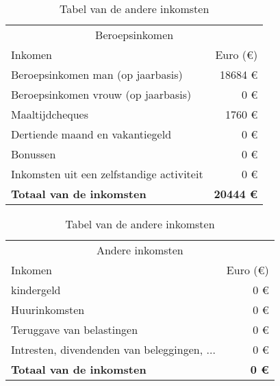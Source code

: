 \begin{table}[ht]
	\begin{minipage}[b]{9cm}\centering
		\begin{tabular}{@{}lr@{}}
			\toprule
			               \multicolumn{2}{c}{Beroepsinkomen}                 \\
			\cmidrule(r){1-2}
		Inkomen               &        Euro (\euro{}) \\ \midrule
			Beroepsinkomen man (op jaarbasis)         &         18684 \euro{} \\
			Beroepsinkomen vrouw (op jaarbasis)       &             0 \euro{} \\
			Maaltijdcheques                           &           1760 \euro{} \\
			Dertiende maand en vakantiegeld           &             0 \euro{} \\
			Bonussen                                  &             0 \euro{} \\
			Inkomsten uit een zelfstandige activiteit &             0 \euro{} \\ \toprule
			\textbf{Totaal van de inkomsten}          & \textbf{20444 \euro{}} \\ \bottomrule
		\end{tabular}
	\caption{Tabel van het beroepsinkomen}
	\label{tab:tabelberoepsinkomen}
		
		
	\end{minipage}
	\hspace{0.5cm}
\begin{minipage}[b]{9cm}\centering
	\begin{tabular}{@{}lr@{}} \toprule
		\multicolumn{2}{c}{Andere inkomsten} \\ \cmidrule(r){1-2}
		Inkomen    										& Euro (\euro{})\\ \midrule
		kindergeld      								& 0 \euro{}\\
		Huurinkomsten    								& 0 \euro{}\\
		Teruggave van belastingen       				& 0 \euro{}\\
		Intresten, divendenden van beleggingen, ...  	& 0 \euro{}\\
		\toprule
		\textbf{Totaal van de inkomsten}              	& \textbf{0 \euro{}}   \\ \bottomrule
	\end{tabular}
	\caption{Tabel van de andere inkomsten}
	\label{tab:tabelandereinkomsten}
	\end{minipage}
\end{table}



